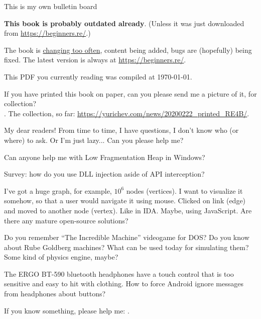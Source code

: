 
\begin{center}
\LARGE{} This is my own bulletin board \normalsize{}
\end{center}

\textbf{This book is probably outdated already}.
(Unless it was just downloaded from \url{https://beginners.re/}.)

The book is \href{\RepoURL/ChangeLog}{changing too often},
content being added, bugs are (hopefully) being fixed.
The latest version is always at \url{https://beginners.re/}.

This PDF you currently reading was compiled at \today{}.

\myhrule{}

If you have printed this book on paper, can you please send me a picture of it, for collection?\\
\EMAILS{}.
The collection, so far: \url{https://yurichev.com/news/20200222_printed_RE4B/}.

\myhrule{}

My dear readers! From time to time, I have questions, I don't know who (or where) to ask.
Or I'm just lazy...
Can you please help me?

\myhrule{}

Can anyone help me with Low Fragmentation Heap in Windows?

\myhrule{}

Survey: how do you use DLL injection aside of API interception?

\myhrule{}

I've got a huge graph, for example, $10^6$ nodes (vertices).
I want to visualize it somehow, so that a user would navigate it using mouse.
Clicked on link (edge) and moved to another node (vertex).
Like in IDA.
Maybe, using JavaScript.
Are there any mature open-source solutions?

\myhrule{}

Do you remember ``The Incredible Machine'' videogame for DOS?
Do you know about Rube Goldberg machines?
What can be used today for simulating them?
Some kind of physics engine, maybe?

\myhrule{}

The ERGO BT-590 bluetooth headphones have a touch control that is too sensitive and easy to hit with clothing.
How to force Android ignore messages from headphones about buttons?

\myhrule{}

If you know something, please help me: \EMAILS{}.

